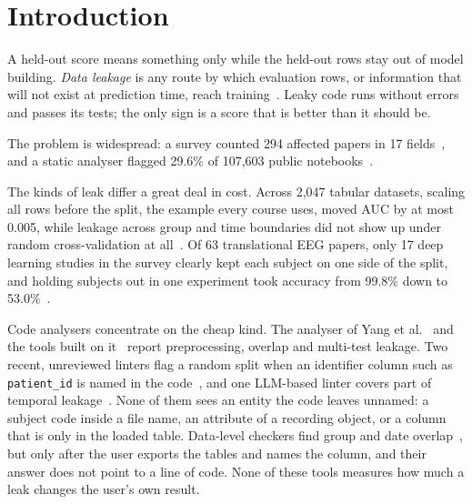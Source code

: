 \documentclass[10pt,a4paper,twocolumn]{article}
\newcommand{\code}[1]{\texttt{#1}}
\begin{document}
\section{Introduction}

A held-out score means something only while the held-out rows stay out of model building. \emph{Data
leakage} is any route by which evaluation rows, or information that will not exist at prediction time, reach
training~\cite{kaufman2012}. Leaky code runs without errors and passes its tests; the only sign is a score that
is better than it should be.

The problem is widespread: a survey counted 294 affected papers in 17
fields~\cite{kapoor2023}, and a static analyser flagged 29.6\% of 107,603 public notebooks~\cite{yang2022}.

The kinds of leak differ a great deal in cost. Across 2,047 tabular datasets, scaling all rows before the split,
the example every course uses, moved AUC by at most 0.005, while leakage across group and time boundaries did not
show up under random cross-validation at all~\cite{roth2026}. Of 63 translational EEG papers, only 17
deep learning studies in the survey clearly kept each subject on one side of the split, and holding subjects out
in one experiment took accuracy from 99.8\% down to 53.0\%~\cite{brookshire2024}.

Code analysers concentrate on the cheap kind. The analyser of Yang et al.~\cite{yang2022} and the tools built on
it~\cite{alomar2025,truong2025,draoui2026} report preprocessing, overlap and multi-test leakage. Two recent,
unreviewed linters flag a random split when an identifier column such as \code{patient\_id} is named in the
code~\cite{leakray,unleak}, and one LLM-based linter covers part of temporal leakage~\cite{samsonau2026}. None
of them sees an entity the code leaves unnamed: a subject code inside a file name, an attribute of a recording
object, or a column that is only in the loaded table. Data-level checkers find group and date
overlap~\cite{chorev2022,leakcheckml,leakhound}, but only after the user exports the tables and names the column,
and their answer does not point to a line of code. None of these tools measures how much a leak changes the
user's own result.
\end{document}
